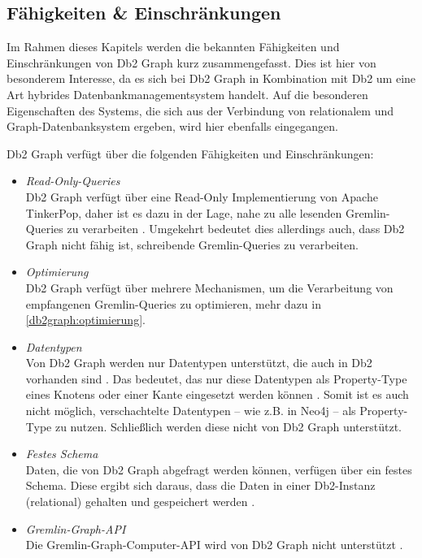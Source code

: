 \subsection{Fähigkeiten \& Einschränkungen}
Im Rahmen dieses Kapitels werden die bekannten Fähigkeiten und Einschränkungen von Db2 Graph kurz zusammengefasst. Dies ist hier von besonderem Interesse, da es sich bei Db2 Graph in Kombination mit Db2 um eine Art hybrides Datenbankmanagementsystem handelt. Auf die besonderen Eigenschaften des Systems, die sich aus der Verbindung von relationalem und Graph-Datenbanksystem ergeben, wird hier ebenfalls eingegangen. 

Db2 Graph verfügt über die folgenden Fähigkeiten und Einschränkungen:

\begin{itemize}
    \item \textit{Read-Only-Queries}\\
    Db2 Graph verfügt über eine Read-Only Implementierung von Apache TinkerPop, daher ist es dazu in der Lage, nahe zu alle lesenden Gremlin-Queries zu verarbeiten \cite{ibm_docs_limitiations}. Umgekehrt bedeutet dies allerdings auch, dass Db2 Graph nicht fähig ist, schreibende Gremlin-Queries zu verarbeiten.
    \item \textit{Optimierung}\\
    Db2 Graph verfügt über mehrere Mechanismen, um die Verarbeitung von empfangenen Gremlin-Queries zu optimieren, mehr dazu in \autoref{db2graph:optimierung}.
    \item \textit{Datentypen}\\
    Von Db2 Graph werden nur Datentypen unterstützt, die auch in Db2 vorhanden sind \cite{ibm_docs_limitiations}. Das bedeutet, das nur diese Datentypen als Property-Type eines Knotens oder einer Kante eingesetzt werden können \cite{ibm_docs_limitiations}. Somit ist es auch nicht möglich, verschachtelte Datentypen -- wie z.B. in Neo4j -- als Property-Type zu nutzen. Schließlich werden diese nicht von Db2 Graph unterstützt.
    \item \textit{Festes Schema}\\
    Daten, die von Db2 Graph abgefragt werden können, verfügen über ein festes Schema. Diese ergibt sich daraus, dass die Daten in einer Db2-Instanz (relational) gehalten und gespeichert werden \cite{sigmod_tian,vldb_tian,yt_tian}.
    \item \textit{Gremlin-Graph-API}\\
    Die Gremlin-Graph-Computer-API wird von Db2 Graph nicht unterstützt \cite{ibm_docs_limitiations}. 
\end{itemize}

